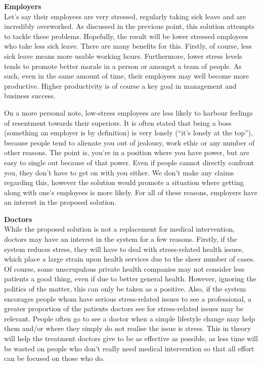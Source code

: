 \documentclass{scrartcl}
\begin{document}
\textbf{Employers}\\
Let's say their employees are very stressed, regularly taking sick leave and
are incredibly overworked. As discussed in the previous point, this solution attempts to tackle these problems. Hopefully, the
result will be lower stressed employees who take less sick leave. There are many benefits for this. Firstly, of course, less sick
leave means more usable working hours. Furthermore, lower stress levels tends to promote better morale in a person or amongst
a team of people. As such, even in the same amount of time, their employees may well become more productive. Higher productivity
is of course a key goal in management and business success.

On a more personal note, low-stress employees are less likely to
harbour feelings of resentment towards their superiors. It is often stated that being a boss (something an employer is by definition)
is very lonely (``it's lonely at the top''), because people tend to alienate you out of jealousy, work ethic or any number of
other reasons. The point is, you're in a position where you have power, but are easy to single out because of that power.
Even if people cannot directly confront you, they don't have to get on with you either. We don't make any claims regarding this,
however the solution would promote a situation where getting along with one's employees is more likely. For all of these reasons,
employers have an interest in the proposed solution.

\textbf{Doctors}\\
While the proposed solution is not a replacement for medical intervention, doctors may have an interest in the system
for a few reasons. Firstly, if the system reduces stress, they will have to deal with stress-related health issues,
which place a large strain upon health services due to the
sheer number of cases.
Of course, some unscrupulous private health companies may not consider less patients a
good thing, even if due to better general health. However, ignoring the politics of the matter, this can only be taken as a positive.
Also, if the system encorages people whom have serious stress-related issues
to see a professional, a greater proportion of the patients doctors see for stress-related issues may be relevant. People
often go to see a doctor when a simple lifestyle change may help them and/or where they
simply do not realise the issue is stress. This in theory will help the treatment doctors give to be as effective as possible, as
less time will be wasted on people who don't really need medical intervention so that all effort can be focused on those who do.
\end{document}
